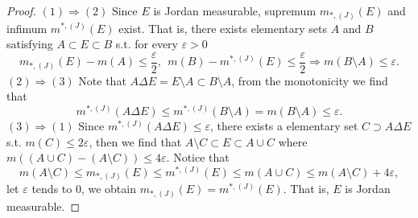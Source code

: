 \documentclass{article}
\begin{document}
\begin{ex}\end{ex}
\begin{proof}
$(1) \Rightarrow (2)$ Since $E$ is Jordan measurable, supremum $m_{*,(J)}(E)$ and infimum $m^{*,(J)}(E)$ exist. 
That is, there exists elementary sets $A$ and $B$ satisfying $A \subset E \subset B$ s.t. for every 
$\varepsilon > 0$$$
m_{*, (J)}(E) - m(A) \leq \frac{\varepsilon}{2},\ \ m(B) - m^{*, (J)}(E) \leq \frac{\varepsilon}{2} \Rightarrow 
m(B \setminus A) \leq \varepsilon.
$$
$(2) \Rightarrow (3)$ Note that $A \Delta E = E \setminus A \subset B \setminus A$, from the monotonicity we find
that \[
m^{*,(J)}(A \Delta E) \leq m^{*,(J)}(B \setminus A) = m(B \setminus A) \leq \varepsilon.
\]
$(3) \Rightarrow (1)$ Since $m^{*,(J)}(A \Delta E) \leq \varepsilon$, there exists a elementary set 
$C \supset A \Delta E$ s.t. $m(C) \leq 2\varepsilon$, then we find that $A \setminus C \subset E \subset A \cup C$
where $m((A \cup C) - (A \setminus C)) \leq 4\varepsilon$. Notice that $$
m(A \setminus C) \leq m_{*,(J)}(E) \leq m^{*, (J)}(E) \leq m(A \cup C) \leq m(A \setminus C) + 4\varepsilon,
$$let $\varepsilon$ tends to 0, we obtain $m_{*,(J)}(E) = m^{*, (J)}(E)$. That is, $E$ is Jordan measurable.
\end{proof}
\end{document}
